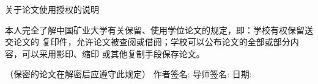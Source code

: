 \vspace{0.8cm}

\begin{center}
\heiti{}关于论文使用授权的说明
\end{center}
\par
本人完全了解中国矿业大学有关保留、使用学位论文的规定，即：学校有权保留送交论文的
复印件，允许论文被查阅或借阅；学校可以公布论文的全部或部分内容，可以采用影印、缩印
或其他复制手段保存论文。
\par
（保密的论文在解密后应遵守此规定） \vskip 12mm
\hspace{20mm}作者签名:\underline{\makebox[0.15\textwidth][c]{}}
导师签名:\underline{\makebox[0.15\textwidth][c]{}}
日期:\underline{\makebox[0.15\textwidth][c]{}} \vskip3mm
\pagebreak

\newpage 
\thispagestyle{empty}
\mbox{} 